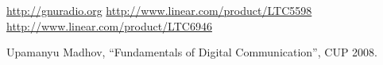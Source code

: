 \documentclass[a4paper,10pt]{article}
\begin{document}
% 
% 


\begin{thebibliography}{9}
 \url{http://gnuradio.org}
 \url{http://www.linear.com/product/LTC5598} 
 \url{http://www.linear.com/product/LTC6946} 
 
  Upamanyu Madhov, ``Fundamentals of Digital Communication'', CUP 2008.
 
 
 \end{thebibliography}
\end{document}

